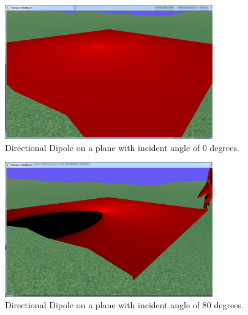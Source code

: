 \documentclass[12pt, twoside,a4paper]{article}
\begin{document}
\begin{figure}[here]
\centering
\includegraphics[width=0.8\textwidth]{test0}
\caption{Directional Dipole on a plane with incident angle of 0 degrees.}
\label{fig:ssdiagram}
\end{figure}
\vspace{1cm}
\begin{figure}[here]
\centering
\includegraphics[width=0.8\textwidth]{test80}
\caption{Directional Dipole on a plane with incident angle of 80 degrees.}
\label{fig:ssdiagram2}
\end{figure}
\end{document}

